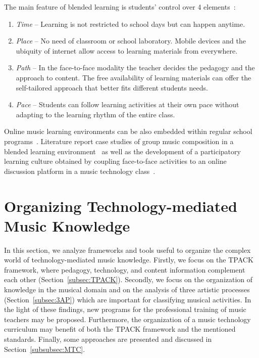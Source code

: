 \documentclass[journal]{IEEEtran}
\begin{document}
The main feature of blended learning is students' control over 4 elements~\cite{roadmap}:
\begin{enumerate}
	\item \textit{Time} -- Learning is not restricted to school days but can happen anytime.
	\item \textit{Place} -- No need of classroom or school laboratory. Mobile devices and the ubiquity of internet allow access to learning materials from everywhere.
	\item \textit{Path} -- In the face-to-face modality the teacher decides the pedagogy and the approach to content. The free availability of learning materials can offer the self-tailored approach that better fits different students needs.
	\item \textit{Pace} -- Students can follow learning activities at their own pace without adapting to the learning rhythm of the entire class. 
\end{enumerate}

Online music learning environments can be also embedded within regular school programs~\cite{crawford2017rethinking}. Literature report case studies of group music composition in a blended learning environment~\cite{ruokonen2016learning} as well as the development of a participatory learning culture obtained by coupling face-to-face activities to an online discussion platform in a music technology class~\cite{draper2008hidden}.



\section{Organizing Technology-mediated Music Knowledge}
\label{sec:OMTK}

In this section, we analyze frameworks and tools useful to organize the complex world of technology-mediated music knowledge. Firstly, we focus on the TPACK framework, where pedagogy, technology, and content information complement each other (Section~\ref{subsec:TPACK}). Secondly, we focus on the organization of knowledge in the musical domain and on the analysis of three artistic processes (Section~\ref{subsec:3AP}) which are important for classifying musical activities. In the light of these findings, new programs for the professional training of music teachers may be proposed. Furthermore, the organization of a music technology curriculum may benefit of both the TPACK framework and the mentioned standards. Finally, some approaches are presented and discussed in Section~\ref{subsubsec:MTC}.
\end{document}

